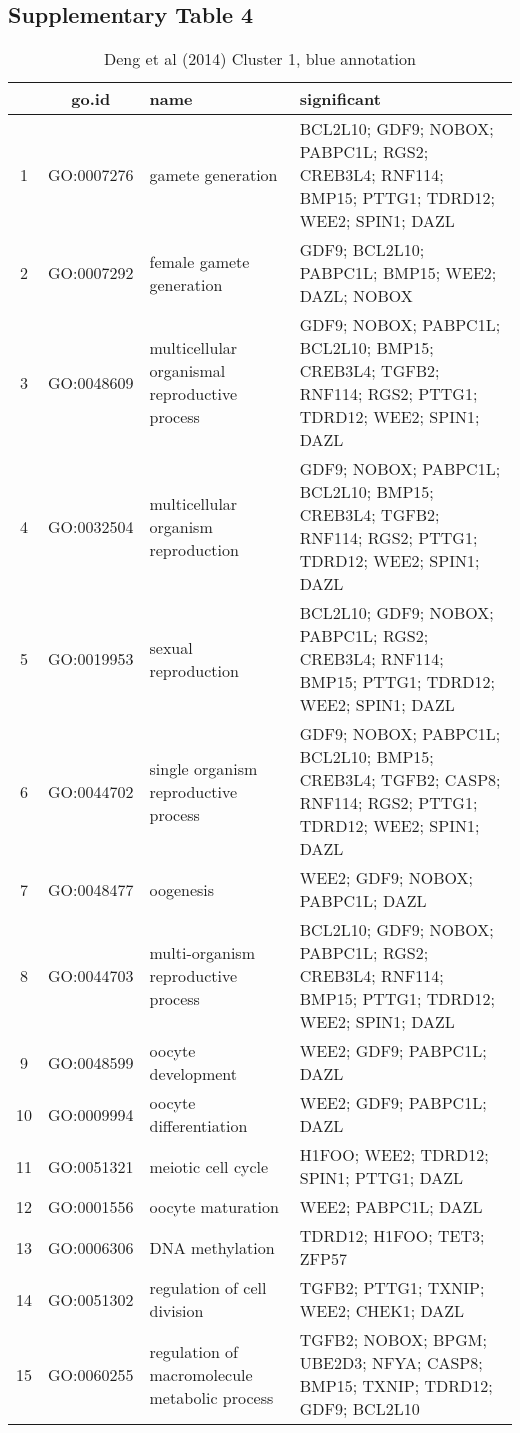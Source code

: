 \subsection{Supplementary Table 4}
\begin{table}[htp]
\begin{center}
\caption{Deng et al (2014) Cluster 1, blue annotation} \label{tab:tab9}
\begin{tabular}{|c|c|p{1.5in}|p{4in}|}
  \hline
 & go.id & name & significant \\ 
  \hline
1 & GO:0007276 & gamete generation & \footnotesize{BCL2L10; GDF9; NOBOX; PABPC1L; RGS2; CREB3L4; RNF114; BMP15; PTTG1; TDRD12; WEE2; SPIN1; DAZL} \\ 
  2 & GO:0007292 & female gamete generation & \footnotesize{GDF9; BCL2L10; PABPC1L; BMP15; WEE2; DAZL; NOBOX} \\ 
  3 & GO:0048609 & multicellular organismal reproductive process & \footnotesize{GDF9; NOBOX; PABPC1L; BCL2L10; BMP15; CREB3L4; TGFB2; RNF114; RGS2; PTTG1; TDRD12; WEE2; SPIN1; DAZL} \\ 
  4 & GO:0032504 & multicellular organism reproduction & \footnotesize{GDF9; NOBOX; PABPC1L; BCL2L10; BMP15; CREB3L4; TGFB2; RNF114; RGS2; PTTG1; TDRD12; WEE2; SPIN1; DAZL}\\ 
  5 & GO:0019953 & sexual reproduction & \footnotesize{BCL2L10; GDF9; NOBOX; PABPC1L; RGS2; CREB3L4; RNF114; BMP15; PTTG1; TDRD12; WEE2; SPIN1; DAZL} \\ 
  6 & GO:0044702 & single organism reproductive process & \footnotesize{GDF9; NOBOX; PABPC1L; BCL2L10; BMP15; CREB3L4; TGFB2; CASP8; RNF114; RGS2; PTTG1; TDRD12; WEE2; SPIN1; DAZL} \\ 
  7 & GO:0048477 & oogenesis & \footnotesize{WEE2; GDF9; NOBOX; PABPC1L; DAZL} \\ 
  8 & GO:0044703 & multi-organism reproductive process & \footnotesize{BCL2L10; GDF9; NOBOX; PABPC1L; RGS2; CREB3L4; RNF114; BMP15; PTTG1; TDRD12; WEE2; SPIN1; DAZL} \\ 
  9 & GO:0048599 & oocyte development  & \footnotesize{WEE2; GDF9; PABPC1L; DAZL} \\ 
  10 & GO:0009994 & oocyte differentiation & \footnotesize{WEE2; GDF9; PABPC1L; DAZL} \\ 
  11 & GO:0051321 & meiotic cell cycle & \footnotesize{H1FOO; WEE2; TDRD12; SPIN1; PTTG1; DAZL} \\ 
  12 & GO:0001556 & oocyte maturation & \footnotesize{WEE2; PABPC1L; DAZL} \\ 
  13 & GO:0006306 & DNA methylation & \footnotesize{TDRD12; H1FOO; TET3; ZFP57} \\ 
  14 & GO:0051302 & regulation of cell division & \footnotesize{TGFB2; PTTG1; TXNIP; WEE2; CHEK1; DAZL} \\ 
  15 & GO:0060255 & regulation of macromolecule metabolic process & \footnotesize{TGFB2; NOBOX; BPGM; UBE2D3; NFYA; CASP8; BMP15; TXNIP; TDRD12; GDF9; BCL2L10} \\ 
 \hline
\end{tabular}
\end{center} \label{tab:tab9}
  \end{table}

